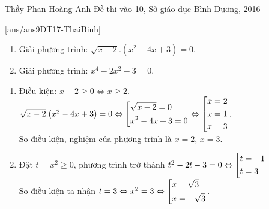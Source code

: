 
\begin{name}
{Thầy  Phan Hoàng Anh}
{Đề thi vào 10, Sở giáo dục Bình Dương, 2016}
\end{name}
\setcounter{ex}{0}
[ans/ans9DT17-ThaiBinh]
\begin{ex}%
    \hfill
    \begin{enumerate}
        \item Giải phương trình: $\sqrt{x-2}.(x^2-4x+3)=0$.
        \item Giải phương trình: $x^4-2x^2-3=0$.
    \end{enumerate}
\loigiai
    {
    \begin{enumerate}
        \item Điều kiện: $x-2\ge0\Leftrightarrow x\ge2$.\\
        $\sqrt{x-2}.(x^2-4x+3)=0\Leftrightarrow\left[\begin{aligned}&\sqrt{x-2}=0\\&x^2-4x+3=0\end{aligned}\right.\Leftrightarrow\left[\begin{aligned}&x=2\\&x=1\\&x=3\end{aligned}\right.$.\\
        So điều kiện, nghiệm của phương trình là $x=2$, $x=3$.
        \item Đặt $t=x^2\ge0$, phương trình trở thành $t^2-2t-3=0\Leftrightarrow\left[\begin{aligned}&t=-1\\&t=3\end{aligned}\right.$\\
        So điều kiện ta nhận $t=3\Leftrightarrow x^2=3\Leftrightarrow\left[\begin{aligned}&x=\sqrt{3}\\&x=-\sqrt{3}\end{aligned}\right.$.
    \end{enumerate}
    }
\end{ex}

